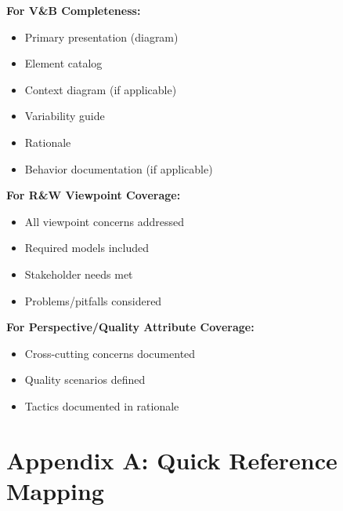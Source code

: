 \documentclass[11pt]{article}
\begin{document}
\begin{checklistbox}
\textbf{For V\&B Completeness:}
\begin{itemize}[leftmargin=1.5cm]
    \item[$\square$] Primary presentation (diagram)
    \item[$\square$] Element catalog
    \item[$\square$] Context diagram (if applicable)
    \item[$\square$] Variability guide
    \item[$\square$] Rationale
    \item[$\square$] Behavior documentation (if applicable)
\end{itemize}

\textbf{For R\&W Viewpoint Coverage:}
\begin{itemize}[leftmargin=1.5cm]
    \item[$\square$] All viewpoint concerns addressed
    \item[$\square$] Required models included
    \item[$\square$] Stakeholder needs met
    \item[$\square$] Problems/pitfalls considered
\end{itemize}

\textbf{For Perspective/Quality Attribute Coverage:}
\begin{itemize}[leftmargin=1.5cm]
    \item[$\square$] Cross-cutting concerns documented
    \item[$\square$] Quality scenarios defined
    \item[$\square$] Tactics documented in rationale
\end{itemize}
\end{checklistbox}

\section{Appendix A: Quick Reference Mapping}
\end{document}
